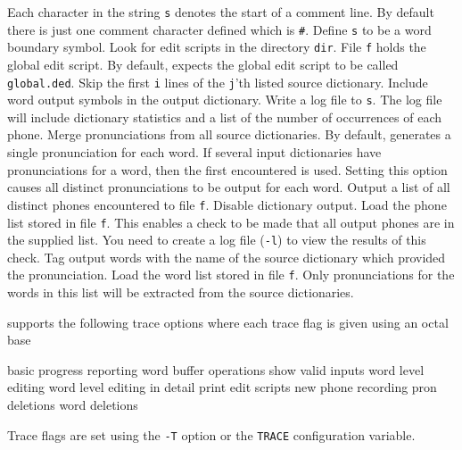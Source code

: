 \begin{optlist}

   Each character in the string \texttt{s} denotes the
      start of a comment line.  By default there is just one
      comment character defined which is \texttt{\#}.
    Define \texttt{s} to be a word boundary symbol.
   Look for edit scripts in the directory \texttt{dir}.
    File \texttt{f} holds the global edit script.  By
     default,  expects the global edit script to be
     called \texttt{global.ded}.
   Skip the first \texttt{i} lines of the \texttt{j}'th
     listed source dictionary.
   Include word output symbols in the output dictionary.
   Write a log file to \texttt{s}.  The log file will include
     dictionary statistics and a list of the number of occurrences
     of each phone.
   Merge pronunciations from all source dictionaries.  By default,
     generates a single pronunciation for each word.  If several
    input dictionaries have pronunciations for a word, then the first encountered
    is used.  Setting this option causes all distinct pronunciations to be
    output for each word.
   Output a list of all distinct phones encountered 
     to file \texttt{f}.
   Disable dictionary output.
    Load the phone list stored in file \texttt{f}.  This
     enables a check to be made that all output phones are in the supplied
     list. You need to create a log file (\texttt{-l}) to view the results of 
     this check.
    Tag output words with the name of the source dictionary which
    provided the pronunciation.
    Load the word list stored in file \texttt{f}.  Only 
    pronunciations for the words in this list will be extracted from
    the source dictionaries. 
\stdoptQ
\end{optlist}


 supports the following trace options where each
trace flag is given using an octal base
\begin{optlist}
    basic progress reporting 
    word buffer operations 
    show valid inputs 
    word level editing 
    word level editing in detail 
    print edit scripts 
    new phone recording 
    pron deletions 
    word deletions                    
\end{optlist}
Trace flags are set using the \texttt{-T} option or the  \texttt{TRACE} 
configuration variable.



